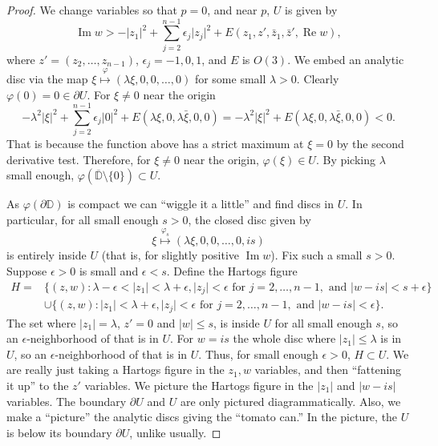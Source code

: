\documentclass[12pt,openany]{book}
\renewcommand{\Re}{\operatorname{Re}}
\renewcommand{\Im}{\operatorname{Im}}
\newcommand{\sabs}[1]{\lvert {#1} \rvert}
\newcommand{\D}{{\mathbb{D}}}
\theoremstyle{plain}
\theoremstyle{remark}
\theoremstyle{definition}
\theoremstyle{exercise}
\theoremstyle{example}
\begin{document}
\begin{proof}
We change variables so that $p = 0$, and
near $p$, $U$ is given by
\begin{equation*}
\Im w > -\sabs{z_1}^2 + \sum_{j=2}^{n-1} \epsilon_j \sabs{z_j}^2 +
E(z_1,z',\bar{z}_1,\bar{z}',\Re w) ,
\end{equation*}
where $z' = (z_2,\ldots,z_{n-1})$, $\epsilon_j = -1,0,1$, and $E$ is $O(3)$.
We embed an analytic disc via the map
$\xi \overset{\varphi}{\mapsto} (\lambda \xi, 0, 0, \ldots, 0)$
for some small $\lambda > 0$.
Clearly $\varphi(0) = 0 \in \partial U$.  For $\xi \not= 0$ near the origin
\begin{equation*}
-\lambda^2 \sabs{\xi}^2 + \sum_{j=2}^{n-1} \epsilon_j \sabs{0}^2 + E(\lambda
\xi,0,\lambda \bar{\xi},0,0)
=
-\lambda^2 \sabs{\xi}^2 + E(\lambda
\xi,0,\lambda \bar{\xi},0,0)
< 0 .
\end{equation*}
That is because
the function above has a strict maximum at $\xi = 0$
by the second derivative test.
Therefore, for $\xi \not= 0$ near the origin,
$\varphi(\xi) \in U$.  By picking $\lambda$ small enough,
$\varphi(\overline{\D}\setminus\{0\}) \subset U$.

As $\varphi(\partial \D)$ is compact we can ``wiggle it a little'' and
find discs in $U$.  In particular, for all small enough $s > 0$,
the closed disc given by
\begin{equation*}
\xi \overset{\varphi_s}{\mapsto} (\lambda \xi, 0, 0, \ldots, 0, i s) 
\end{equation*}
is entirely inside $U$ (that is, for slightly positive $\Im w$).
Fix such a small $s > 0$.
Suppose $\epsilon > 0$ is small and $\epsilon < s$.
Define the Hartogs figure
\begin{equation*}
\begin{split}
H =
& \bigl\{ (z,w) : \lambda - \epsilon < \sabs{z_1} < \lambda + \epsilon,
\sabs{z_j} < \epsilon \text{ for } j=2,\ldots,n-1, \text{ and }
\sabs{w-is} < s+\epsilon \bigr\} 
\\
&
\cup 
\bigl\{ (z,w) : \sabs{z_1} < \lambda + \epsilon, 
\sabs{z_j} < \epsilon \text{ for } j=2,\ldots,n-1, \text{ and }
\sabs{w-is} < \epsilon \bigr\} .
\end{split}
\end{equation*}
The set where $\sabs{z_1} = \lambda$, $z' = 0$
and $\sabs{w} \leq s$, is inside $U$ for all small enough $s$, so
an $\epsilon$-neighborhood of that is in $U$.
For
$w = is$ the whole disc where $\sabs{z_1} \leq \lambda$ is in $U$,
so an $\epsilon$-neighborhood of that is in $U$.
Thus, for small enough $\epsilon >0$, $H \subset U$.
We are really just taking a Hartogs figure in the $z_1,w$ variables, and then
``fattening it up'' to the $z'$ variables.
We picture the Hartogs figure in the $\sabs{z_1}$ and $\sabs{w-is}$
variables.  The boundary $\partial U$ and $U$ are only pictured diagrammatically.
Also, we make a ``picture'' the analytic discs giving the ``tomato can.''
In the picture, the $U$ is below its boundary $\partial U$, unlike usually.


\end{proof}
\end{document}
